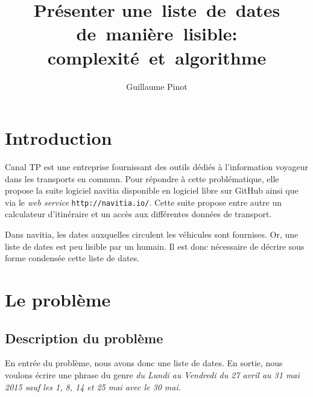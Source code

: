 \documentclass{roadef}
\begin{document}
\title{Présenter une~liste~de~dates de~manière~lisible: complexité~et~algorithme}

\def\shorttitle{Présenter une~liste~de~dates de~manière~lisible}

\author{Guillaume Pinot}

{}

\maketitle
\thispagestyle{empty}



\section{Introduction}

Canal TP est une entreprise fournissant des outils dédiés à
l'information voyageur dans les transports en commun. Pour répondre à
cette problématique, elle propose la suite logiciel navitia disponible
en logiciel libre sur GitHub ainsi que via le \emph{web service}
\texttt{http://navitia.io/}. Cette suite propose entre autre un
calculateur d'itinéraire et un accès aux différentes données de
transport.

Dans navitia, les dates auxquelles circulent les véhicules sont
fournises.  Or, une liste de dates est peu lisible par un humain. Il
est donc nécessaire de décrire sous forme condensée cette liste de
dates.

\section{Le problème}

\subsection{Description du problème}

En entrée du problème, nous avons donc une liste de dates.  En sortie,
nous voulons écrire une phrase du genre \emph{du Lundi au Vendredi du
  27 avril au 31 mai 2015 sauf les 1, 8, 14 et 25 mai avec le 30 mai}.
\end{document}
